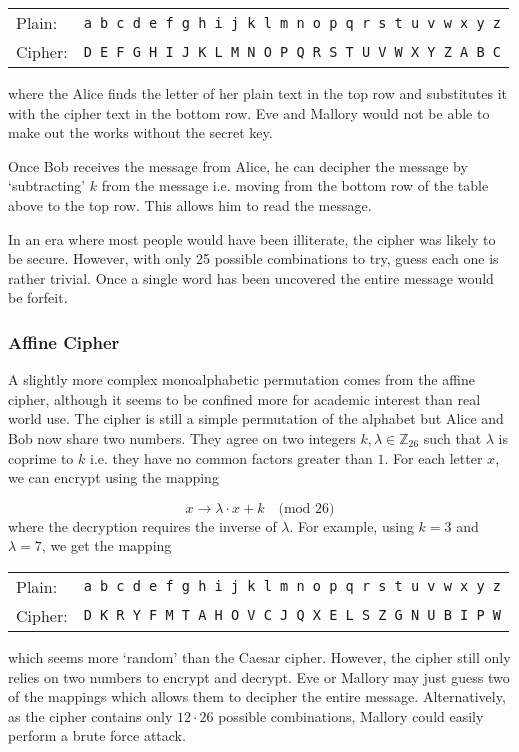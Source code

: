 \begin{center}
\begin{tabular}{l l}%
	Plain:  &\quad\texttt{a b c d e f g h i j k l m n o p q r s t u v w x y z} \\ 
	Cipher: &\quad\texttt{D E F G H I J K L M N O P Q R S T U V W X Y Z A B C} \\
\end{tabular}
\end{center}
where the Alice finds the letter of her plain text in the top row and substitutes it with the cipher text in the bottom row. Eve and Mallory would not be able to make out the works without the secret key. 

Once Bob receives the message from Alice, he can decipher the message by `subtracting' $k$ from the message i.e. moving from the bottom row of the table above to the top row. This allows him to read the message.

In an era where most people would have been illiterate, the cipher was likely to be secure. However, with only 25 possible combinations to try, guess each one is rather trivial. Once a single word has been uncovered the entire message would be forfeit. 

\subsubsection*{Affine Cipher}

A slightly more complex monoalphabetic permutation comes from the affine cipher, although it seems to be confined more for academic interest than real world use. The cipher is still a simple permutation of the alphabet but Alice and Bob now share two numbers. They agree on two integers $k,\lambda\in \mathbb{Z}_{26}$ such that $\lambda$ is coprime to $k$ i.e. they have no common factors greater than $1$. For each letter $x$, we can encrypt using the mapping

\begin{equation}
	x \rightarrow \lambda \cdot x + k\quad\text{(mod 26)}
\end{equation}
where the decryption requires the inverse of $\lambda$. For example, using $k = 3$ and $\lambda = 7$, we get the mapping

\begin{center}
\begin{tabular}{l l}
	Plain:  &\quad\texttt{a b c d e f g h i j k l m n o p q r s t u v w x y z} \\ 
	Cipher: &\quad\texttt{D K R  Y F M T A H O V C J Q X E L S Z G N U B I P W} \\
\end{tabular}
\end{center}
which seems more `random' than the Caesar cipher. However, the cipher still only relies on two numbers to encrypt and decrypt. Eve or Mallory may just guess two of the mappings which allows them to decipher the entire message. Alternatively, as the cipher contains only $12 \cdot 26$ possible combinations, Mallory could easily perform a brute force attack.

